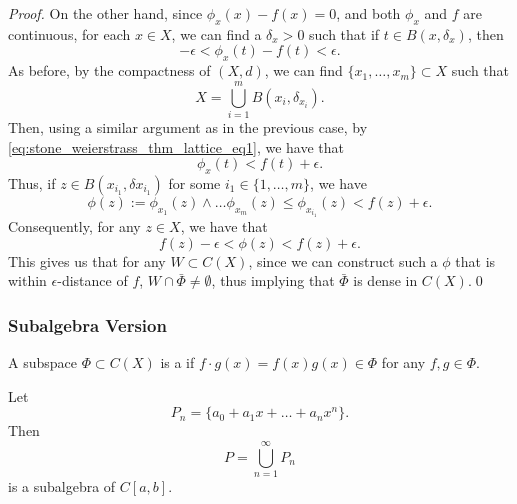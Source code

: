 \documentclass[notoc,notitlepage]{tufte-book}
\begin{document}
\begin{proof}
  On the other hand, since $\phi_{x}(x) - f(x) = 0$, and both $\phi_{x}$ and $f$ are continuous, for each $x \in X$, we can find a $\delta_x > 0$ such that if $t \in B(x, \delta_x)$, then
  \begin{equation}\label{eq:stone_weierstrass_thm_lattice_eq1}
    - \epsilon < \phi_x(t) - f(t) < \epsilon.
  \end{equation}
  As before, by the compactness of $(X, d)$, we can find $\{ x_1, \ldots, x_m \} \subset X$ such that
  \begin{equation*}
    X = \bigcup_{i=1}^{m} B \left( x_i, \delta_{x_i} \right).
  \end{equation*}
  Then, using a similar argument as in the previous case, by \cref{eq:stone_weierstrass_thm_lattice_eq1}, we have that
  \begin{equation*}
    \phi_x(t) < f(t) + \epsilon.
  \end{equation*}
  Thus, if $z \in B(x_{i_1}, \delta{x_{i_1}})$ for some $i_1 \in \{ 1, \ldots, m \}$, we have
  \begin{equation*}
    \phi(z) := \phi_{x_1}(z) \land \hdots \phi_{x_m}(z) \leq \phi_{x_{i_1}}(z) < f(z) + \epsilon.
  \end{equation*}
  Consequently, for any $z \in X$, we have that
  \begin{equation*}
    f(z) - \epsilon < \phi(z) < f(z) + \epsilon.
  \end{equation*}
  This gives us that for any $W \subset C(X)$, since we can construct such a $\phi$ that is within $\epsilon$-distance of $f$, $W \cap \bar{\Phi} \neq \emptyset$, thus implying that $\bar{\Phi}$ is dense in $C(X)$.\qed\
\end{proof}


\subsubsection{Subalgebra Version}%
\label{ssub:subalgebra_version}

\begin{defn}[Subalgebra]\label{defn:subalgebra}
  A subspace $\Phi \subset C(X)$ is a \hlnoteb{subalgebra} if $f \cdot g(x) = f(x) g(x) \in \Phi$ for any $f, g \in \Phi$.
\end{defn}

\begin{eg}
  Let
  \begin{equation*}
    P_n = \{ a_0 + a_1 x + \hdots + a_n x^n \}.
  \end{equation*}
  Then
  \begin{equation*}
    P = \bigcup_{n=1}^{\infty} P_n
  \end{equation*}
  is a subalgebra of $C[a, b]$.
\end{eg}
\end{document}
